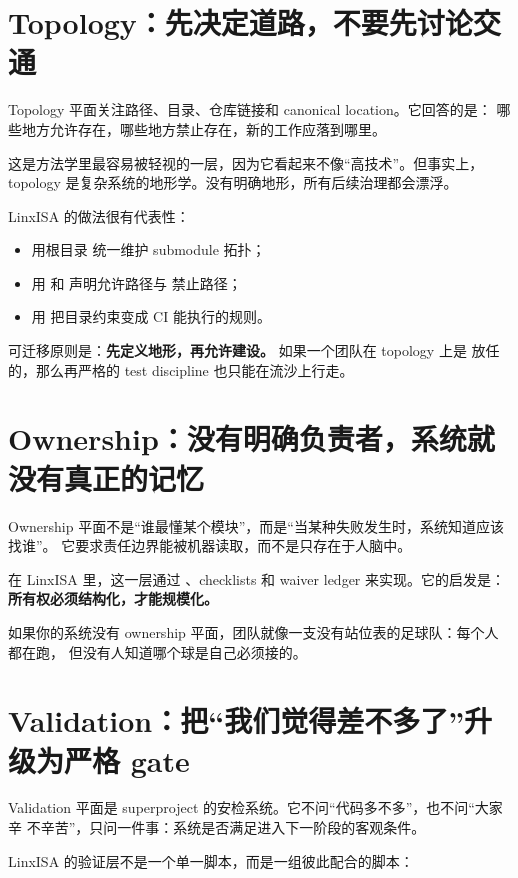 \documentclass[UTF8,11pt,a4paper,oneside]{ctexbook}
\begin{document}
\section{Topology：先决定道路，不要先讨论交通}

Topology 平面关注路径、目录、仓库链接和 canonical location。它回答的是：
哪些地方允许存在，哪些地方禁止存在，新的工作应落到哪里。

这是方法学里最容易被轻视的一层，因为它看起来不像“高技术”。但事实上，topology
是复杂系统的地形学。没有明确地形，所有后续治理都会漂浮。

LinxISA 的做法很有代表性：

\begin{itemize}
  \item 用根目录  统一维护 submodule 拓扑；
  \item 用  和  声明允许路径与
  禁止路径；
  \item 用  把目录约束变成 CI 能执行的规则。
\end{itemize}

可迁移原则是：\textbf{先定义地形，再允许建设。} 如果一个团队在 topology 上是
放任的，那么再严格的 test discipline 也只能在流沙上行走。

\section{Ownership：没有明确负责者，系统就没有真正的记忆}

Ownership 平面不是“谁最懂某个模块”，而是“当某种失败发生时，系统知道应该找谁”。
它要求责任边界能被机器读取，而不是只存在于人脑中。

在 LinxISA 里，这一层通过 、checklists 和 waiver ledger
来实现。它的启发是：\textbf{所有权必须结构化，才能规模化。}

如果你的系统没有 ownership 平面，团队就像一支没有站位表的足球队：每个人都在跑，
但没有人知道哪个球是自己必须接的。

\section{Validation：把“我们觉得差不多了”升级为严格 gate}

Validation 平面是 superproject 的安检系统。它不问“代码多不多”，也不问“大家辛
不辛苦”，只问一件事：系统是否满足进入下一阶段的客观条件。

LinxISA 的验证层不是一个单一脚本，而是一组彼此配合的脚本：
\end{document}
